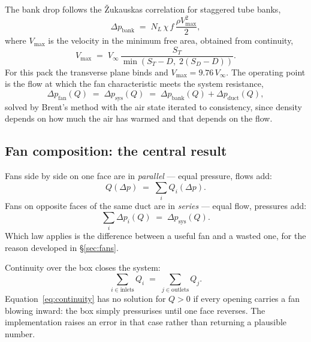 \documentclass[11pt,a4paper]{article}
\begin{document}
The bank drop follows the Žukauskas correlation for staggered tube banks,
\begin{equation}
\Delta p_{\mathrm{bank}} \;=\; N_L \, \chi \, f \, \frac{\rho V_{\max}^{2}}{2},
\label{eq:dpbank}
\end{equation}
where $V_{\max}$ is the velocity in the minimum free area, obtained from
continuity,
\begin{equation}
V_{\max} \;=\; V_{\infty}\,\frac{S_T}{\min\!\left(S_T - D,\; 2(S_D - D)\right)}.
\label{eq:vmax}
\end{equation}
For this pack the transverse plane binds and $V_{\max} = 9.76\,V_{\infty}$. The
operating point is the flow at which the fan characteristic meets the system
resistance,
\begin{equation}
\Delta p_{\mathrm{fan}}(Q) \;=\; \Delta p_{\mathrm{sys}}(Q)
\;=\; \Delta p_{\mathrm{bank}}(Q) + \Delta p_{\mathrm{duct}}(Q),
\label{eq:op}
\end{equation}
solved by Brent's method with the air state iterated to consistency, since
density depends on how much the air has warmed and that depends on the flow.

\subsection{Fan composition: the central result}

Fans side by side on one face are in \emph{parallel} --- equal pressure, flows
add:
\begin{equation}
Q(\Delta p) \;=\; \sum_i Q_i(\Delta p).
\label{eq:parallel}
\end{equation}
Fans on opposite faces of the same duct are in \emph{series} --- equal flow,
pressures add:
\begin{equation}
\boxed{\;\sum_i \Delta p_i(Q) \;=\; \Delta p_{\mathrm{sys}}(Q).\;}
\label{eq:series}
\end{equation}
Which law applies is the difference between a useful fan and a wasted one, for
the reason developed in \S\ref{sec:fans}.

Continuity over the box closes the system:
\begin{equation}
\sum_{i \in \mathrm{inlets}} Q_i \;=\; \sum_{j \in \mathrm{outlets}} Q_j .
\label{eq:continuity}
\end{equation}
Equation~\eqref{eq:continuity} has no solution for $Q > 0$ if every opening
carries a fan blowing inward: the box simply pressurises until one face
reverses. The implementation raises an error in that case rather than returning
a plausible number.
\end{document}
